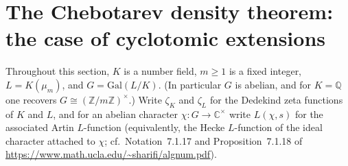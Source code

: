 \section{The Chebotarev density theorem: the case of cyclotomic extensions}

Throughout this section, $K$ is a number field, $m \geq 1$ is a fixed integer,
$L = K(\mu_m)$, and $G = \mathrm{Gal}(L/K)$.  (In particular $G$ is abelian, and for
$K=\mathbb{Q}$ one recovers $G \cong (\mathbb{Z}/m\mathbb{Z})^\times$.)
Write $\zeta_K$ and $\zeta_L$ for the Dedekind zeta functions of $K$ and $L$, and for
an abelian character $\chi : G \to \mathbb{C}^\times$ write $L(\chi,s)$ for the associated
Artin $L$-function (equivalently, the Hecke $L$-function of the ideal character attached to
$\chi$; cf.\ Notation~7.1.17 and Proposition~7.1.18 of
\url{https://www.math.ucla.edu/~sharifi/algnum.pdf}).

